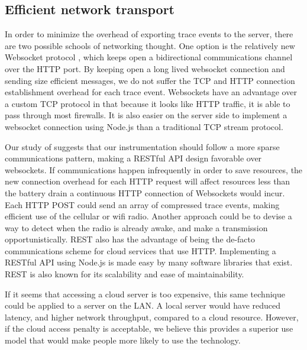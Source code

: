 \subsection{Efficient network transport}
In order to minimize the overhead of exporting trace 
events to the server, there are two possible schools of networking thought.
One option is the relatively new Websocket protocol 
\cite{WebsocketRFC}, which keeps open a bidirectional communications channel 
over the HTTP port. By keeping open a long lived 
websocket connection and sending size efficient 
messages, we do not suffer the TCP and HTTP connection establishment overhead 
for each trace event. Websockets have an advantage over a custom TCP protocol
in that because it looks like HTTP traffic, it is able to pass through most
firewalls. It is also easier on the server side to implement a websocket
connection using Node.js than a traditional TCP stream protocol.

Our study of \cite{PeriodicTransfers} suggests that
our instrumentation should follow a more sparse communications pattern, making
a RESTful API\cite{REST} design favorable over websockets. If communications
happen infrequently in order to save resources, the new connection overhead for
each HTTP request will affect resources less than the battery
drain a continuous HTTP connection of Websockets would incur.
Each HTTP POST could send an array of compressed trace events, making
efficient use of the cellular or wifi radio. Another approach could be to 
devise a way to detect when the radio is already awake, and make a transmission
opportunistically. REST also has the advantage of being the de-facto communications
scheme for cloud services that use HTTP. Implementing a RESTful API using Node.js is made easy
by many software libraries that exist. REST is also known for its scalability and ease of 
maintainability.

If it seems that accessing a cloud server is too expensive, this same technique could
be applied to a server on the LAN. A local server would have reduced latency, and higher network throughput,
compared to a cloud resource. However, if the cloud access penalty is acceptable, we believe this provides
a superior use model that would make people more likely to use the technology. 


